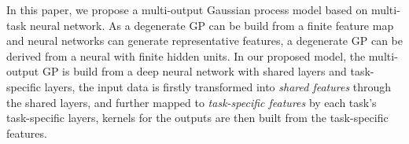 In this paper, we propose a multi-output Gaussian process model based on multi-task neural network. As a degenerate GP can be build from a finite feature map and neural networks can generate representative features, a degenerate GP can be derived from a neural with finite hidden units. In our proposed model, the multi-output GP is build from a deep neural network with shared layers and task-specific layers, the input data is firstly transformed into \emph{shared features} through the shared layers, and further mapped to \emph{task-specific features} by each task's task-specific layers, kernels for the outputs are then built from the task-specific features. 

